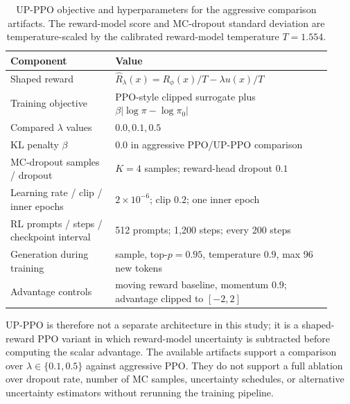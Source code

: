 \documentclass[11pt]{article}
\newcommand{\Rphi}{R_{\phi}}
\begin{document}
\begin{table}[t]
\centering
\small
\caption{UP-PPO objective and hyperparameters for the aggressive comparison artifacts. The reward-model score and MC-dropout standard deviation are temperature-scaled by the calibrated reward-model temperature $T=1.554$.}
\label{tab:uppo-hyperparameters}
\begin{tabular}{p{0.30\linewidth}p{0.62\linewidth}}
\toprule
Component & Value \\
\midrule
Shaped reward & $\widehat R_{\lambda}(x)=\Rphi(x)/T-\lambda u(x)/T$ \\
Training objective & PPO-style clipped surrogate plus $\beta |\log\pi-\log\pi_0|$ \\
Compared $\lambda$ values & $0.0, 0.1, 0.5$ \\
KL penalty $\beta$ & $0.0$ in aggressive PPO/UP-PPO comparison \\
MC-dropout samples / dropout & $K=4$ samples; reward-head dropout $0.1$ \\
Learning rate / clip / inner epochs & $2\times10^{-6}$; clip $0.2$; one inner epoch \\
RL prompts / steps / checkpoint interval & 512 prompts; 1,200 steps; every 200 steps \\
Generation during training & sample, top-$p=0.95$, temperature $0.9$, max 96 new tokens \\
Advantage controls & moving reward baseline, momentum $0.9$; advantage clipped to $[-2,2]$ \\
\bottomrule
\end{tabular}
\end{table}

UP-PPO is therefore not a separate architecture in this study; it is a shaped-reward PPO variant in which reward-model uncertainty is subtracted before computing the scalar advantage. The available artifacts support a comparison over $\lambda\in\{0.1,0.5\}$ against aggressive PPO. They do not support a full ablation over dropout rate, number of MC samples, uncertainty schedules, or alternative uncertainty estimators without rerunning the training pipeline.
\end{document}
